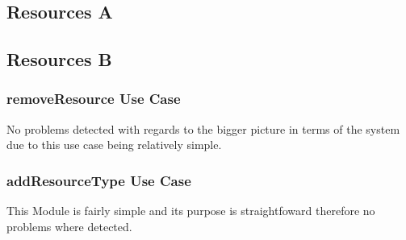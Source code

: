 \documentclass[a4paper]{article}
\begin{document}
\subsection {Resources A}
\subsection {Resources B}
\subsubsection{removeResource Use Case}
No problems detected with regards to the bigger picture in terms of the system due to this use case being relatively simple.
\subsubsection{addResourceType Use Case}
This Module is fairly simple and its purpose is straightfoward therefore no problems where detected.
\end{document}
